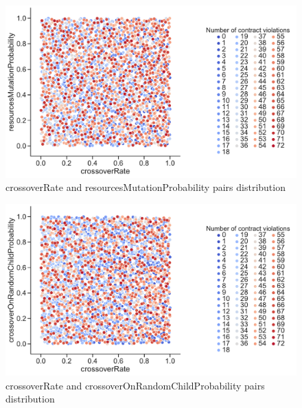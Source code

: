 \clearpage
\begin{figure}
	\centering
	\includegraphics[width=\textwidth]{images/PairsDistr/crossoverRate_resourcesMutationProbability.pdf}
	\caption[crossoverRate and resourcesMutationProbability pairs distribution]{crossoverRate and resourcesMutationProbability pairs distribution}
	\label{fig:crossoverRate_resourcesMutationProbability_pair}
\end{figure}
\clearpage
\begin{figure}
	\centering
	\includegraphics[width=\textwidth]{images/PairsDistr/crossoverRate_crossoverOnRandomChildProbability.pdf}
	\caption[crossoverRate and crossoverOnRandomChildProbability pairs distribution]{crossoverRate and crossoverOnRandomChildProbability pairs distribution}
	\label{fig:crossoverRate_crossoverOnRandomChildProbability_pair}
\end{figure}
\clearpage
